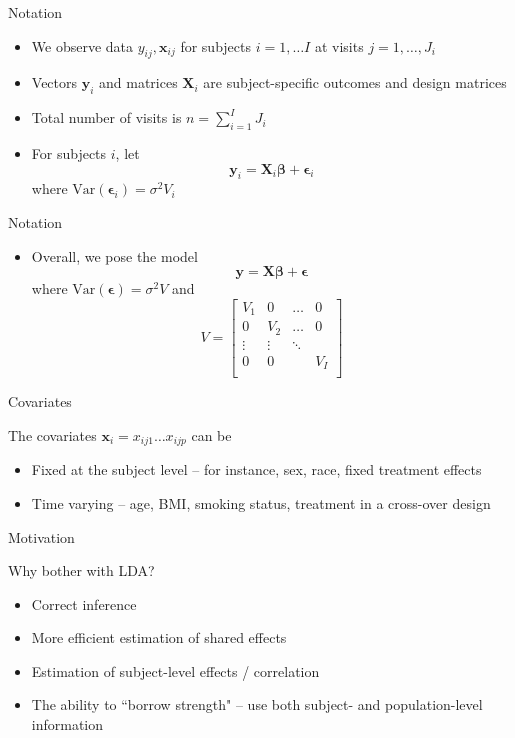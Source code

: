 \documentclass{beamer}
\newcommand{\myitem}{\item[\tiny$\blacksquare$]}
\def\bx{\boldsymbol{x}}
\def\by{\boldsymbol{y}}
\def\bX{\boldsymbol{X}}
\def\bbeta{\boldsymbol{\beta}}
\def\bepsilon{\boldsymbol{\epsilon}}
\newcommand{\bi}{\begin{itemize}}
\newcommand{\ei}{\end{itemize}}
\newcommand{\var}{\mbox{Var}}
\newcommand{\1}{{\mathbf{1}}}
\begin{document}

\begin{frame}{Notation}

\bi
	\myitem We observe data $y_{ij}, \bx_{ij}$ for subjects $i = 1, \ldots I$ at visits $j = 1, \ldots, J_i$
	\myitem Vectors $\by_{i}$ and matrices $\bX_{i}$ are subject-specific outcomes and design matrices
	\myitem Total number of visits is $n = \sum_{i = 1}^{I} J_i$
	\myitem For subjects $i$, let
		$$ \by_{i} = \bX_{i} \bbeta + \bepsilon_{i}$$
	where $\var(\bepsilon_{i}) = \sigma^2 V_{i}$
\ei

\end{frame}



\begin{frame}{Notation}

\bi
	\myitem Overall, we pose the model 
		$$ \by = \bX \bbeta + \bepsilon$$
	where $\var(\bepsilon) = \sigma^2 V$ and 
		$$ V = \left[ \begin{array}{cccc}
			V_1 		& 0 		& \ldots 	& 0 \\
			0 		& V_2	& \ldots 	& 0 \\
			\vdots 	& \vdots	& \ddots 	&  \\
			0 		& 0 		& 		& V_{I} \\
		 \end{array} \right]
		 $$
\ei


\end{frame}



\begin{frame}{Covariates}

The covariates $\bx_{i} = x_{ij1} \ldots x_{ijp}$ can be
\bi
	\myitem Fixed at the subject level -- for instance, sex, race, fixed treatment effects
	\myitem Time varying -- age, BMI, smoking status, treatment in a cross-over design
\ei
\end{frame}



\begin{frame}{Motivation}

Why bother with LDA?
\bi
	\myitem Correct inference
	\myitem More efficient estimation of shared effects
	\myitem Estimation of subject-level effects / correlation
	\myitem The ability to ``borrow strength" -- use both subject- and population-level information
\ei

\end{frame}
\end{document}
